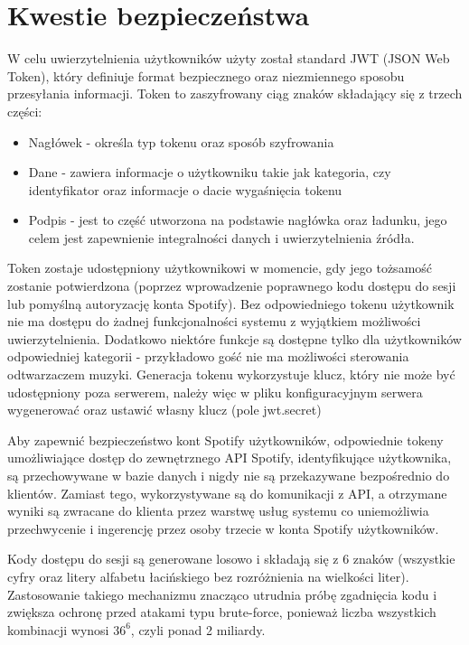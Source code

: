 \section{Kwestie bezpieczeństwa}
W celu uwierzytelnienia użytkowników użyty został standard JWT (JSON Web Token), który definiuje format bezpiecznego oraz niezmiennego sposobu przesyłania informacji. Token to zaszyfrowany ciąg znaków składający się z trzech części: 
\begin{itemize}
\item Nagłówek - określa typ tokenu oraz sposób szyfrowania
\item Dane - zawiera informacje o użytkowniku takie jak kategoria, czy identyfikator oraz informacje o dacie wygaśnięcia tokenu
\item Podpis - jest to część utworzona na podstawie nagłówka oraz ładunku, jego celem jest zapewnienie integralności danych i uwierzytelnienia źródła.
\end{itemize}

Token zostaje udostępniony użytkownikowi w momencie, gdy jego tożsamość zostanie potwierdzona (poprzez wprowadzenie poprawnego kodu dostępu do sesji lub pomyślną autoryzację konta Spotify). Bez odpowiedniego tokenu użytkownik nie ma dostępu do żadnej funkcjonalności systemu z wyjątkiem możliwości uwierzytelnienia. Dodatkowo niektóre funkcje są dostępne tylko dla użytkowników odpowiedniej kategorii - przykładowo gość nie ma możliwości sterowania odtwarzaczem muzyki. Generacja tokenu wykorzystuje klucz, który nie może być udostępniony poza serwerem, należy więc w pliku konfiguracyjnym serwera wygenerować oraz ustawić własny klucz (pole jwt.secret)

Aby zapewnić bezpieczeństwo kont Spotify użytkowników, odpowiednie tokeny umożliwiające dostęp do zewnętrznego API Spotify, identyfikujące użytkownika, są przechowywane w bazie danych i nigdy nie są przekazywane bezpośrednio do klientów. Zamiast tego, wykorzystywane są do komunikacji z API, a otrzymane wyniki są zwracane do klienta przez warstwę usług systemu co uniemożliwia przechwycenie i ingerencję przez osoby trzecie w konta Spotify użytkowników.

Kody dostępu do sesji są generowane losowo i składają się z 6 znaków (wszystkie cyfry oraz litery alfabetu łacińskiego bez rozróżnienia na wielkości liter). Zastosowanie takiego mechanizmu znacząco utrudnia próbę zgadnięcia kodu i zwiększa ochronę przed atakami typu brute-force, ponieważ liczba wszystkich kombinacji wynosi $36^6$, czyli ponad 2 miliardy.

